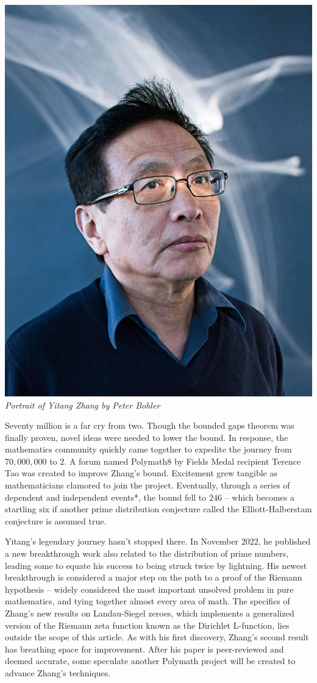 \documentclass{article}
\begin{document}
\begin{center}
    \includegraphics[scale=0.06]{images/yitang.jpg}    
    \textit{Portrait of Yitang Zhang by Peter Bohler}
\end{center}

Seventy million is a far cry from two. Though the bounded gaps theorem was finally proven, novel ideas were needed to lower the bound. In response, the mathematics community quickly came together to expedite the journey from $70,000,000$ to $2$. A forum named Polymath8 by Fields Medal recipient Terence Tao was created to improve Zhang’s bound. Excitement grew tangible as mathematicians clamored to join the project. Eventually, through a series of dependent and independent events*, the bound fell to $246$ – which becomes a startling six if another prime distribution conjecture called the Elliott-Halberstam conjecture is assumed true. 

Yitang’s legendary journey hasn’t stopped there. In November 2022, he published a new breakthrough work also related to the distribution of prime numbers, leading some to equate his success to being struck twice by lightning. His newest breakthrough is considered a major step on the path to a proof of the Riemann hypothesis – widely considered the most important unsolved problem in pure mathematics, and tying together almost every area of math. The specifics of Zhang’s new results on Landau-Siegel zeroes, which implements a generalized version of the Riemann zeta function known as the Dirichlet L-function, lies outside the scope of this article. As with his first discovery, Zhang’s second result has breathing space for improvement. After his paper is peer-reviewed and deemed accurate, some speculate another Polymath project will be created to advance Zhang’s techniques.
\end{document}
